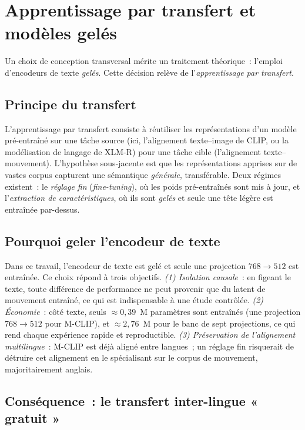 \documentclass[12pt,a4paper,oneside]{report}
\theoremstyle{definition}
\theoremstyle{plain}
\begin{document}
\section{Apprentissage par transfert et modèles gelés}
\label{sec:transfert}

Un choix de conception transversal mérite un traitement théorique~: l'emploi
d'encodeurs de texte \emph{gelés}. Cette décision relève de l'\emph{apprentissage
par transfert}.

\subsection{Principe du transfert}

L'apprentissage par transfert consiste à réutiliser les représentations d'un modèle
pré-entraîné sur une tâche source (ici, l'alignement texte--image de CLIP, ou la
modélisation de langage de XLM-R) pour une tâche cible (l'alignement
texte--mouvement). L'hypothèse sous-jacente est que les représentations apprises sur
de vastes corpus capturent une sémantique \emph{générale}, transférable. Deux
régimes existent~: le \emph{réglage fin} (\emph{fine-tuning}), où les poids
pré-entraînés sont mis à jour, et l'\emph{extraction de caractéristiques}, où ils
sont \emph{gelés} et seule une tête légère est entraînée par-dessus.

\subsection{Pourquoi geler l'encodeur de texte}

Dans ce travail, l'encodeur de texte est gelé et seule une projection
$768\rightarrow512$ est entraînée. Ce choix répond à trois objectifs. \emph{(1)
Isolation causale}~: en figeant le texte, toute différence de performance ne peut
provenir que du latent de mouvement entraîné, ce qui est indispensable à une étude
contrôlée. \emph{(2) Économie}~: côté texte, seuls $\approx0{,}39$~M paramètres
sont entraînés (une projection $768\rightarrow512$ pour M-CLIP), et $\approx2{,}76$~M
pour le banc de sept projections, ce qui rend chaque expérience rapide et
reproductible.
\emph{(3) Préservation de l'alignement multilingue}~: M-CLIP est déjà aligné entre
langues~; un réglage fin risquerait de détruire cet alignement en le spécialisant
sur le corpus de mouvement, majoritairement anglais.

\subsection{Conséquence~: le transfert inter-lingue « gratuit »}
\end{document}
